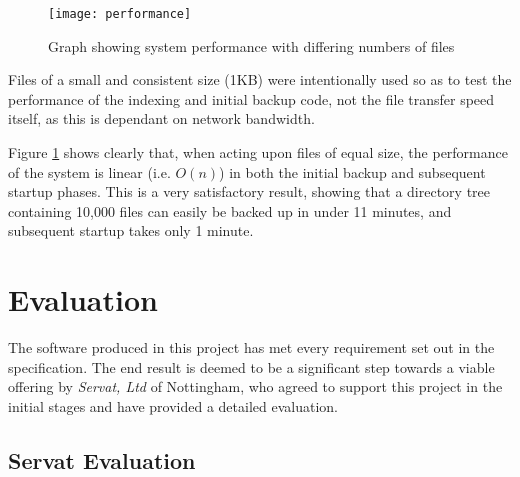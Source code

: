 \begin{figure}
    \begin{center}
        \texttt{[image: performance]}
    \end{center}
    \caption{Graph showing system performance with differing numbers of files}
    \label{fig:performance-graph}
\end{figure}

Files of a small and consistent size (1KB) were intentionally used so as to
test the performance of the indexing and initial backup code, not the file
transfer speed itself, as this is dependant on network bandwidth.

Figure \ref{fig:performance-graph} shows clearly that, when acting upon files
of equal size, the performance of the system is linear (i.e. $O(n)$) in both
the initial backup and subsequent startup phases. This is a very satisfactory
result, showing that a directory tree containing 10,000 files can easily be
backed up in under 11 minutes, and subsequent startup takes only 1 minute.

\section{Evaluation}

The software produced in this project has met every requirement set out in the
specification. The end result is deemed to be a significant step towards
a viable offering by \emph{Servat, Ltd} of Nottingham, who agreed to support
this project in the initial stages and have provided a detailed evaluation.

\subsection{Servat Evaluation}

